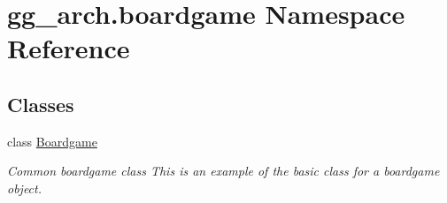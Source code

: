\hypertarget{namespacegg__arch_1_1boardgame}{\section{gg\-\_\-arch.\-boardgame Namespace Reference}
\label{namespacegg__arch_1_1boardgame}
}
\subsection*{Classes}
\begin{DoxyCompactItemize}
\item 
class \hyperlink{classgg__arch_1_1boardgame_1_1_boardgame}{Boardgame}
\begin{DoxyCompactList}\small\item\em Common boardgame class This is an example of the basic class for a boardgame object. \end{DoxyCompactList}\end{DoxyCompactItemize}
